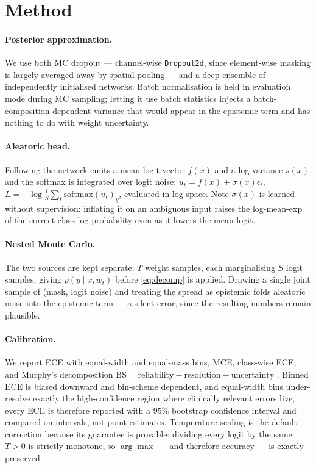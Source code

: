 \documentclass{article}
\begin{document}
\section{Method}

\paragraph{Posterior approximation.} We use both MC dropout --- channel-wise
\texttt{Dropout2d}, since element-wise masking is largely averaged away by
spatial pooling --- and a deep ensemble of independently initialised networks.
Batch normalisation is held in evaluation mode during MC sampling; letting it use
batch statistics injects a batch-composition-dependent variance that would appear
in the epistemic term and has nothing to do with weight uncertainty.

\paragraph{Aleatoric head.} Following \citet{kendall2017uncertainties} the network
emits a mean logit vector $f(x)$ and a log-variance $s(x)$, and the softmax is
integrated over logit noise: $u_t = f(x) + \sigma(x)\epsilon_t$,
$L = -\log \frac{1}{S}\sum_t \mathrm{softmax}(u_t)_y$, evaluated in log-space.
Note $\sigma(x)$ is learned without supervision: inflating it on an ambiguous
input raises the log-mean-exp of the correct-class log-probability even as it
lowers the mean logit.

\paragraph{Nested Monte Carlo.} The two sources are kept separate: $T$ weight
samples, each marginalising $S$ logit samples, giving $p(y\mid x, w_t)$ before
\eqref{eq:decomp} is applied. Drawing a single joint sample of (mask, logit
noise) and treating the spread as epistemic folds aleatoric noise into the
epistemic term --- a silent error, since the resulting numbers remain plausible.

\paragraph{Calibration.} We report ECE with equal-width and equal-mass bins, MCE,
class-wise ECE, and Murphy's decomposition
$\mathrm{BS} = \text{reliability} - \text{resolution} + \text{uncertainty}$
\citep{murphy1973}. Binned ECE is biased downward and bin-scheme dependent, and
equal-width bins under-resolve exactly the high-confidence region where
clinically relevant errors live; every ECE is therefore reported with a $95\%$
bootstrap confidence interval and compared on intervals, not point estimates.
Temperature scaling \citep{guo2017calibration} is the default correction because
its guarantee is provable: dividing every logit by the same $T>0$ is strictly
monotone, so $\arg\max$ --- and therefore accuracy --- is exactly preserved.
\end{document}
